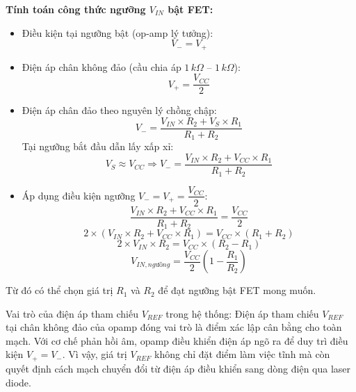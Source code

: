 \textbf{Tính toán công thức ngưỡng $V_{IN}$ bật FET:}
\begin{itemize}
    \item Điều kiện tại ngưỡng bật (op-amp lý tưởng):
    \begin{equation*}
    V_- = V_+
    \end{equation*}

    \item Điện áp chân không đảo (cầu chia áp $1\,k\Omega$ -- $1\,k\Omega$):
    \begin{equation*}
    V_+ = \frac{V_{CC}}{2}
    \end{equation*}

    \item Điện áp chân đảo theo nguyên lý chồng chập:
    \begin{equation*}
    V_-=\frac{V_{IN}\times R_2+V_S\times R_1}{R_1+R_2}
    \end{equation*}
    Tại ngưỡng bắt đầu dẫn lấy xấp xỉ:
    \begin{equation*}
    V_S \approx V_{CC}
    \Rightarrow
    V_-=\frac{V_{IN}\times R_2+V_{CC}\times R_1}{R_1+R_2}
    \end{equation*}

    \item Áp dụng điều kiện ngưỡng $V_-=V_+=\dfrac{V_{CC}}{2}$:
    \begin{equation*}
    \frac{V_{IN}\times R_2+V_{CC}\times R_1}{R_1+R_2}=\frac{V_{CC}}{2}
    \end{equation*}
    \begin{equation*}
    2\times\left(V_{IN}\times R_2+V_{CC}\times R_1\right)=V_{CC}\times(R_1+R_2)
    \end{equation*}
    \begin{equation*}
    2\times V_{IN}\times R_2=V_{CC}\times(R_2-R_1)
    \end{equation*}
    \begin{equation}
    \boxed{V_{IN,ngưỡng}=\frac{V_{CC}}{2}\left(1-\frac{R_1}{R_2}\right)}
    \end{equation}
\end{itemize}

Từ đó có thể chọn giá trị $R_1$ và $R_2$ để đạt ngưỡng bật FET mong muốn.

Vai trò của điện áp tham chiếu $V_{REF}$ trong hệ thống: Điện áp tham chiếu $V_{REF}$ tại chân không đảo của opamp đóng vai trò là điểm xác lập cân bằng cho toàn mạch. Với cơ chế phản hồi âm, opamp điều khiển điện áp ngõ ra để duy trì điều kiện $V_+ = V_-$. Vì vậy, giá trị $V_{REF}$ không chỉ đặt điểm làm việc tĩnh mà còn quyết định cách mạch chuyển đổi từ điện áp điều khiển sang dòng điện qua laser diode.


